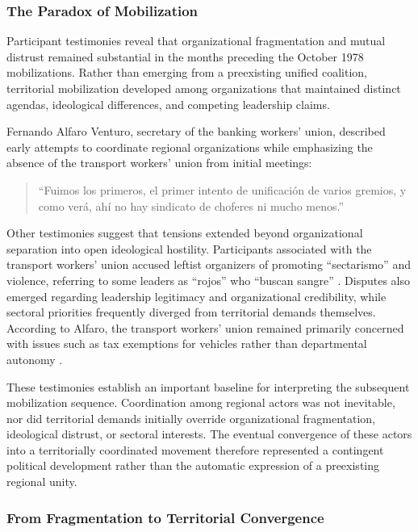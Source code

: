 \documentclass[12pt]{article}
\begin{document}
\subsubsection{The Paradox of Mobilization}

Participant testimonies reveal that organizational fragmentation and mutual distrust remained substantial in the months preceding the October 1978 mobilizations. Rather than emerging from a preexisting unified coalition, territorial mobilization developed among organizations that maintained distinct agendas, ideological differences, and competing leadership claims.

Fernando Alfaro Venturo, secretary of the banking workers’ union, described early attempts to coordinate regional organizations while emphasizing the absence of the transport workers’ union from initial meetings:

\begin{quote}
``Fuimos los primeros, el primer intento de unificación de varios gremios, y como verá, ahí no hay sindicato de choferes ni mucho menos.'' 
\parencite[00:20:41--00:20:50]{tapuya_huaman_documental_2024}
\end{quote}

Other testimonies suggest that tensions extended beyond organizational separation into open ideological hostility. Participants associated with the transport workers’ union accused leftist organizers of promoting ``sectarismo'' and violence, referring to some leaders as ``rojos'' who ``buscan sangre'' \parencite[00:24:30--00:25:20]{tapuya_huaman_documental_2024}. Disputes also emerged regarding leadership legitimacy and organizational credibility, while sectoral priorities frequently diverged from territorial demands themselves. According to Alfaro, the transport workers’ union remained primarily concerned with issues such as tax exemptions for vehicles rather than departmental autonomy \parencite[00:27:55--00:28:20]{tapuya_huaman_documental_2024}.

These testimonies establish an important baseline for interpreting the subsequent mobilization sequence. Coordination among regional actors was not inevitable, nor did territorial demands initially override organizational fragmentation, ideological distrust, or sectoral interests. The eventual convergence of these actors into a territorially coordinated movement therefore represented a contingent political development rather than the automatic expression of a preexisting regional unity.

\subsubsection{From Fragmentation to Territorial Convergence}
\end{document}
